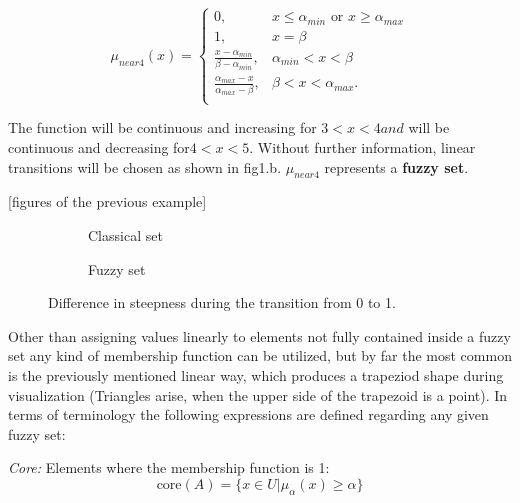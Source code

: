 \[
	\mu_{near 4}(x) =
		\begin{cases}
			0, &x \leq \alpha_{min} \text{ or } x \geq \alpha_{max}\\
			1, &x = \beta\\
			\frac{x - \alpha_{min}}{\beta - \alpha_{min}}, &\alpha_{min} < x < \beta\\
			\frac{\alpha_{max} - x}{\alpha_{max} - \beta}, &\beta < x < \alpha_{max}.\\
		\end{cases}
\]

The function will be continuous and increasing for $3 < x < 4 and$ will be continuous and decreasing for$ 4 < x < 5$. Without further information, linear transitions will be chosen as shown in fig1.b. $\mu_{near 4} $ represents a \textbf{fuzzy set}.

[figures of the previous example]
\begin{figure}[!h]
\centering
\begin{subfigure}{.5\textwidth}
	\centering
  	\caption{Classical set}
  	\label{fig:sub1}
\end{subfigure}%
\begin{subfigure}{.5\textwidth}
	\centering
  	\caption{Fuzzy set}
  	\label{fig:sub2}
\end{subfigure}
\caption{Difference in steepness during the transition from 0 to 1.}
\label{fig:steepness}
\end{figure}

Other than assigning values linearly to elements not fully contained inside a fuzzy set any kind of membership function can be utilized, but by far the most common is the previously mentioned linear way, which produces a trapeziod shape during visualization (Triangles arise, when the upper side of the trapezoid is a point). In terms of terminology the following expressions are defined regarding any given fuzzy set:

\textit{Core:} Elements where the membership function is 1:
\[
	\text{core}(A) = \{x \in U \vert \mu_{\alpha}(x) \geq \alpha\}
\]

